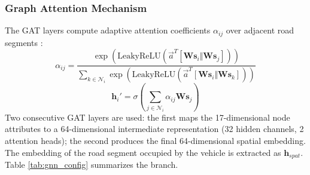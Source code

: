 \documentclass[journal]{IEEEtran}
\begin{document}
\subsubsection{Graph Attention Mechanism}
The GAT layers compute adaptive attention coefficients $\alpha_{ij}$ over adjacent road segments \cite{xia_attention-based_2023, ren_graph_2024, chen_gms_2026}:
\begin{equation}
  \alpha_{ij} = \frac{\exp\left(\text{LeakyReLU}\left(\vec{a}^T [\mathbf{W}\mathbf{s}_i \Vert \mathbf{W}\mathbf{s}_j]\right)\right)}{\sum_{k \in \mathcal{N}_i} \exp\left(\text{LeakyReLU}\left(\vec{a}^T [\mathbf{W}\mathbf{s}_i \Vert \mathbf{W}\mathbf{s}_k]\right)\right)}
\end{equation}
\begin{equation}
  \mathbf{h}_i' = \sigma \left( \sum_{j \in \mathcal{N}_i} \alpha_{ij} \mathbf{W}\mathbf{s}_j \right)
\end{equation}
Two consecutive GAT layers are used: the first maps the 17-dimensional node attributes to a 64-dimensional intermediate representation (32 hidden channels, 2 attention heads); the second produces the final 64-dimensional spatial embedding. The embedding of the road segment occupied by the vehicle is extracted as $\mathbf{h}_{spat}$. Table \ref{tab:gnn_config} summarizes the branch.

\begin{table}[!htbp]
  \centering
  \caption{Summary of GAT branch configuration}
  \label{tab:gnn_config}
  \renewcommand{\arraystretch}{1.15}
\end{table}
\end{document}

